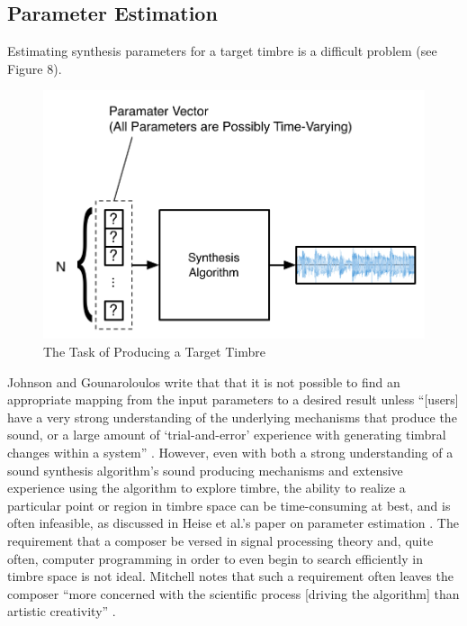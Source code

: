\documentclass[12pt]{report} 	%
\numberwithin{figure}{chapter}
\numberwithin{table}{chapter}
\numberwithin{equation}{chapter}
\begin{document}
\begin{flushleft}
\section{Parameter Estimation}
Estimating synthesis parameters for a target timbre is a difficult problem (see Figure 8). 
\begin{figure}[h!]
\begin{center}
\includegraphics[scale=0.7]{ResynthesisProblem}
\caption[Producing a target timbre]{The Task of Producing a Target Timbre}
\end{center}
\vspace{6pt}
\end{figure}
Johnson and Gounaroloulos \cite{Johnson:2006pi} write that that it is not possible to find an appropriate mapping from the input parameters to a desired result unless ``[users] have a very strong understanding of the underlying mechanisms that produce the sound, or a large amount of `trial-and-error' experience with generating timbral changes within a system'' \cite[p. 1]{Johnson:2006pi}. However, even with both a strong understanding of a sound synthesis algorithm's sound producing mechanisms and extensive experience using the algorithm to explore timbre, the ability to realize a particular point or region in timbre space can be time-consuming at best, and is often infeasible, as discussed in Heise et al.'s paper on parameter estimation \cite[p. 1]{Heise:2009sp}. The requirement that a composer be versed in signal processing theory and, quite often, computer programming in order to even begin to search efficiently in timbre space is not ideal. Mitchell notes that such a requirement often leaves the composer ``more concerned with the scientific process [driving the algorithm] than artistic creativity'' \cite[p. 1]{Mitchell:2007fe}.


\end{flushleft}
\end{document}
